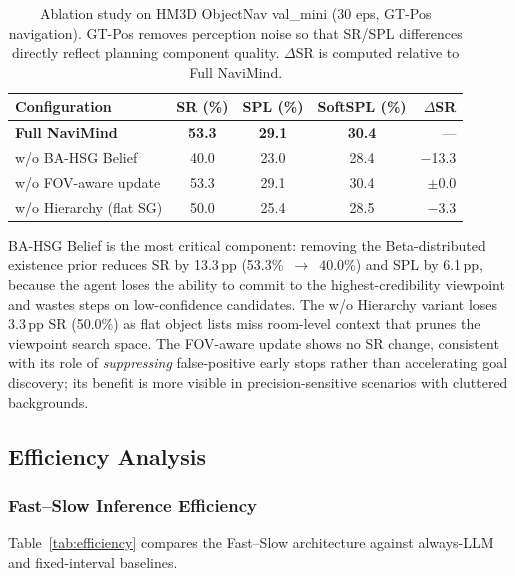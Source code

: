 \documentclass[conference]{IEEEtran}
\begin{document}
\begin{table}[t]
\centering
\caption{Ablation study on HM3D ObjectNav val\_mini (30 eps, GT-Pos navigation).
GT-Pos removes perception noise so that SR/SPL differences directly reflect planning component quality.
$\Delta$SR is computed relative to Full NaviMind.}
\label{tab:ablation}
\footnotesize
\begin{tabular}{@{}lcccr@{}}
\toprule
Configuration & SR (\%) & SPL (\%) & SoftSPL (\%) & $\Delta$SR \\
\midrule
\textbf{Full NaviMind}    & \textbf{53.3} & \textbf{29.1} & \textbf{30.4} & --- \\
w/o BA-HSG Belief         & 40.0 & 23.0 & 28.4 & $-$13.3 \\
w/o FOV-aware update      & 53.3 & 29.1 & 30.4 & $\pm$0.0 \\
w/o Hierarchy (flat SG)   & 50.0 & 25.4 & 28.5 & $-$3.3 \\
\bottomrule
\end{tabular}
\vspace{-2mm}
\end{table}

BA-HSG Belief is the most critical component: removing the Beta-distributed existence prior reduces SR by 13.3\,pp (53.3\%~$\to$~40.0\%) and SPL by 6.1\,pp, because the agent loses the ability to commit to the highest-credibility viewpoint and wastes steps on low-confidence candidates.
The w/o Hierarchy variant loses 3.3\,pp SR (50.0\%) as flat object lists miss room-level context that prunes the viewpoint search space.
The FOV-aware update shows no SR change, consistent with its role of \emph{suppressing} false-positive early stops rather than accelerating goal discovery; its benefit is more visible in precision-sensitive scenarios with cluttered backgrounds.

\subsection{Efficiency Analysis}
\label{sec:efficiency}

\subsubsection{Fast--Slow Inference Efficiency}

Table~\ref{tab:efficiency} compares the Fast--Slow architecture against always-LLM and fixed-interval baselines.
\end{document}
